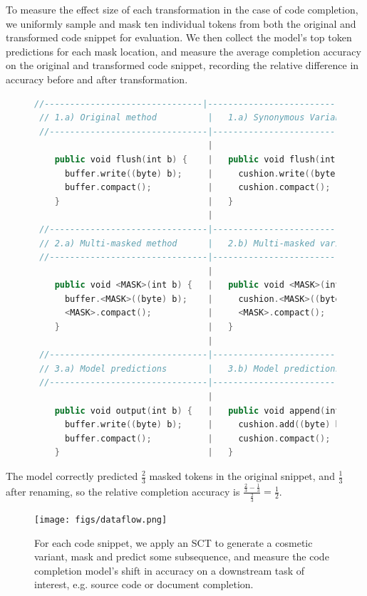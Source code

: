 \documentclass[sigconf,review,anonymous]{acmart}
\begin{document}
  To measure the effect size of each transformation in the case of code completion, we uniformly sample and mask ten individual tokens from both the original and transformed code snippet for evaluation. We then collect the model's top token predictions for each mask location, and measure the average completion accuracy on the original and transformed code snippet, recording the relative difference in accuracy before and after transformation.

  \begin{figure}[H]
    \centering
  \begin{lstlisting}[basicstyle=\scriptsize\ttfamily, language=kotlin,label={lst:example2}]
 //-------------------------------|-------------------------------
 // 1.a) Original method          |   1.a) Synonymous Variant
 //-------------------------------|-------------------------------
                                  |
    public void flush(int b) {    |   public void flush(int b) {
      buffer.write((byte) b);     |     cushion.write((byte) b);
      buffer.compact();           |     cushion.compact();
    }                             |   }
                                  |
 //-------------------------------|-------------------------------
 // 2.a) Multi-masked method      |   2.b) Multi-masked variant
 //-------------------------------|-------------------------------
                                  |
    public void <MASK>(int b) {   |   public void <MASK>(int b) {
      buffer.<MASK>((byte) b);    |     cushion.<MASK>((byte) b);
      <MASK>.compact();           |     <MASK>.compact();
    }                             |   }
                                  |
 //-------------------------------|-------------------------------
 // 3.a) Model predictions        |   3.b) Model predictions
 //-------------------------------|-------------------------------
                                  |
    public void output(int b) {   |   public void append(int b) {
      buffer.write((byte) b);     |     cushion.add((byte) b);
      buffer.compact();           |     cushion.compact();
    }                             |   }
  \end{lstlisting}
  \end{figure}

  The model correctly predicted $\frac{2}{3}$ masked tokens in the original snippet, and $\frac{1}{3}$ after renaming, so the relative completion accuracy is $\frac{\frac{2}{3} - \frac{1}{3}}{\frac{2}{3}} = \frac{1}{2}$.

  \begin{figure}[H]
    \centering
    \texttt{[image: figs/dataflow.png]}
    \caption{For each code snippet, we apply an SCT to generate a cosmetic variant, mask and predict some subsequence, and measure the code completion model's shift in accuracy on a downstream task of interest, e.g. source code or document completion.}
    \label{fig:dataflow}
  \end{figure}
\end{document}
